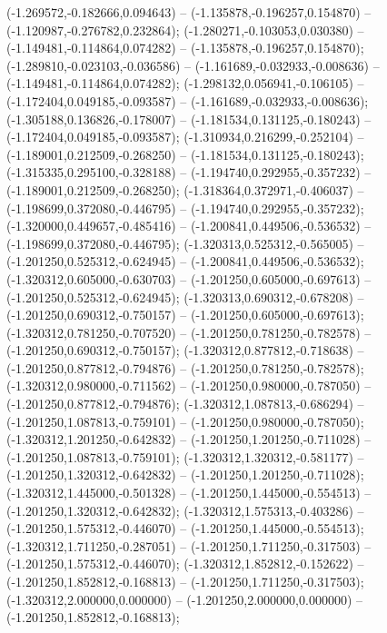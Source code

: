  (-1.269572,-0.182666,0.094643) -- (-1.135878,-0.196257,0.154870) -- (-1.120987,-0.276782,0.232864);
 (-1.280271,-0.103053,0.030380) -- (-1.149481,-0.114864,0.074282) -- (-1.135878,-0.196257,0.154870);
 (-1.289810,-0.023103,-0.036586) -- (-1.161689,-0.032933,-0.008636) -- (-1.149481,-0.114864,0.074282);
 (-1.298132,0.056941,-0.106105) -- (-1.172404,0.049185,-0.093587) -- (-1.161689,-0.032933,-0.008636);
 (-1.305188,0.136826,-0.178007) -- (-1.181534,0.131125,-0.180243) -- (-1.172404,0.049185,-0.093587);
 (-1.310934,0.216299,-0.252104) -- (-1.189001,0.212509,-0.268250) -- (-1.181534,0.131125,-0.180243);
 (-1.315335,0.295100,-0.328188) -- (-1.194740,0.292955,-0.357232) -- (-1.189001,0.212509,-0.268250);
 (-1.318364,0.372971,-0.406037) -- (-1.198699,0.372080,-0.446795) -- (-1.194740,0.292955,-0.357232);
 (-1.320000,0.449657,-0.485416) -- (-1.200841,0.449506,-0.536532) -- (-1.198699,0.372080,-0.446795);
 (-1.320313,0.525312,-0.565005) -- (-1.201250,0.525312,-0.624945) -- (-1.200841,0.449506,-0.536532);
 (-1.320312,0.605000,-0.630703) -- (-1.201250,0.605000,-0.697613) -- (-1.201250,0.525312,-0.624945);
 (-1.320313,0.690312,-0.678208) -- (-1.201250,0.690312,-0.750157) -- (-1.201250,0.605000,-0.697613);
 (-1.320312,0.781250,-0.707520) -- (-1.201250,0.781250,-0.782578) -- (-1.201250,0.690312,-0.750157);
 (-1.320312,0.877812,-0.718638) -- (-1.201250,0.877812,-0.794876) -- (-1.201250,0.781250,-0.782578);
 (-1.320312,0.980000,-0.711562) -- (-1.201250,0.980000,-0.787050) -- (-1.201250,0.877812,-0.794876);
 (-1.320312,1.087813,-0.686294) -- (-1.201250,1.087813,-0.759101) -- (-1.201250,0.980000,-0.787050);
 (-1.320312,1.201250,-0.642832) -- (-1.201250,1.201250,-0.711028) -- (-1.201250,1.087813,-0.759101);
 (-1.320312,1.320312,-0.581177) -- (-1.201250,1.320312,-0.642832) -- (-1.201250,1.201250,-0.711028);
 (-1.320312,1.445000,-0.501328) -- (-1.201250,1.445000,-0.554513) -- (-1.201250,1.320312,-0.642832);
 (-1.320312,1.575313,-0.403286) -- (-1.201250,1.575312,-0.446070) -- (-1.201250,1.445000,-0.554513);
 (-1.320312,1.711250,-0.287051) -- (-1.201250,1.711250,-0.317503) -- (-1.201250,1.575312,-0.446070);
 (-1.320312,1.852812,-0.152622) -- (-1.201250,1.852812,-0.168813) -- (-1.201250,1.711250,-0.317503);
 (-1.320312,2.000000,0.000000) -- (-1.201250,2.000000,0.000000) -- (-1.201250,1.852812,-0.168813);
